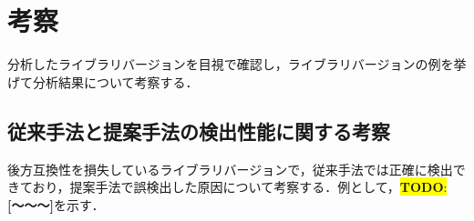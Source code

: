 \documentclass[11pt,dvipdfmx]{jreport}
\newcommand{\todo}[1]{\colorbox{yellow}{{\bf TODO}:}{\color{red} {\textbf{[#1]}}}}
\begin{document}
\section{考察}\label{rq2:kousatu}
分析したライブラリバージョンを目視で確認し，ライブラリバージョンの例を挙げて分析結果について考察する．

\subsection{従来手法と提案手法の検出性能に関する考察}
後方互換性を損失しているライブラリバージョンで，従来手法では正確に検出できており，提案手法で誤検出した原因について考察する．例として，\todo{〜〜〜}を示す．





\end{document}

